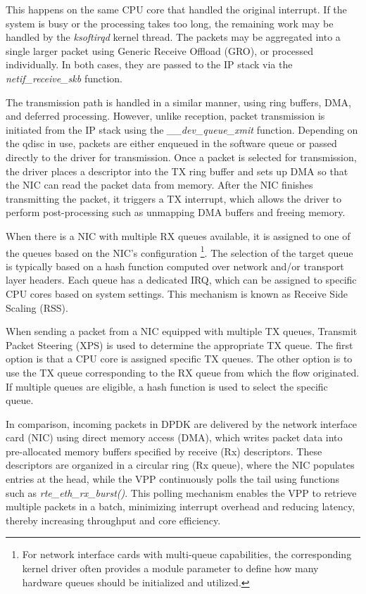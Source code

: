 This happens on the same CPU core that handled the original interrupt. If the system is busy or the processing takes too long, the remaining work may be handled by the \textit{ksoftirqd} kernel thread. 
The packets may be aggregated into a single larger packet using Generic Receive Offload (GRO), or processed individually. 
In both cases, they are passed to the IP stack via the \textit{netif\_receive\_skb} function.

The transmission path is handled in a similar manner, using ring buffers, DMA, and deferred processing. 
However, unlike reception, packet transmission is initiated from the IP stack using the \textit{\_\_dev\_queue\_xmit} function. 
Depending on the qdisc in use, packets are either enqueued in the software queue or passed directly to the driver for transmission.
Once a packet is selected for transmission, the driver places a descriptor into the TX ring buffer and sets up DMA so that the NIC can read the packet data from memory.
After the NIC finishes transmitting the packet, it triggers a TX interrupt, which allows the driver to perform post-processing such as unmapping DMA buffers and freeing memory.~\cite{linux-packet-input}

When there is a NIC with multiple RX queues available, it is assigned to one of the queues based on the NIC's configuration%
\footnote{For network interface cards with multi-queue capabilities, the corresponding kernel driver often provides a module parameter to define how many hardware queues should be initialized and utilized.}.
The selection of the target queue is typically based on a hash function computed over network and/or transport layer headers.
Each queue has a dedicated IRQ, which can be assigned to specific CPU cores based on system settings. This mechanism is known as Receive Side Scaling (RSS).

When sending a packet from a NIC equipped with multiple TX queues, Transmit Packet Steering (XPS) is used to determine the appropriate TX queue.
The first option is that a CPU core is assigned specific TX queues. The other option is to use the TX queue corresponding to the RX queue from which the flow originated.
If multiple queues are eligible, a hash function is used to select the specific queue.~\cite{linux-rss}

In comparison, incoming packets in DPDK are delivered by the network interface card (NIC) using direct memory access (DMA),
which writes packet data into pre-allocated memory buffers specified by receive (Rx) descriptors.
These descriptors are organized in a circular ring (Rx queue), where the NIC populates entries at the head, while the VPP continuously polls the tail using functions such as                    
\textit{rte\_eth\_rx\_burst()}. This polling mechanism enables the VPP to retrieve multiple packets in a batch,
minimizing interrupt overhead and reducing latency, thereby increasing throughput and core efficiency.~\cite{intel-core-utilization-2025}
 
